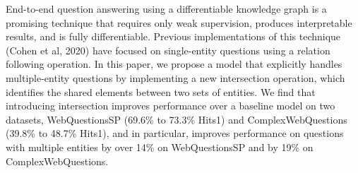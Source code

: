 End-to-end question answering using a differentiable knowledge graph is a promising technique that requires only weak supervision, produces interpretable results, and is fully differentiable. Previous implementations of this technique (Cohen et al, 2020) have focused on single-entity questions using a relation following operation. In this paper, we propose a model that explicitly handles multiple-entity questions by implementing a new intersection operation, which identifies the shared elements between two sets of entities. We find that introducing intersection improves performance over a baseline model on two datasets, WebQuestionsSP (69.6\% to 73.3\% Hits\@1) and ComplexWebQuestions (39.8\% to 48.7\% Hits\@1), and in particular, improves performance on questions with multiple entities by over 14\% on WebQuestionsSP and by 19\% on ComplexWebQuestions.
